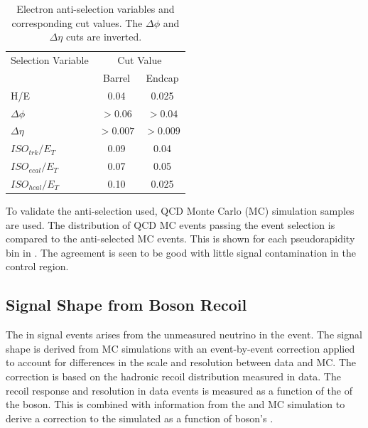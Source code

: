 \begin{table}[htbp]
  \begin{center}
    \leavevmode
    \begin{tabular}{lcc} 
    \toprule
      Selection Variable & \multicolumn{2}{c}{Cut Value}\\
                         & Barrel & Endcap\\
    \midrule
        H/E & 0.04 & 0.025 \\
        $\Delta\phi$ & $>0.06$  & $>0.04$ \\
        $\Delta\eta$ & $>0.007$ & $>0.009$\\
        $ISO_{trk} / E_T $ & 0.09 & 0.04 \\
        $ISO_{ecal}/ E_T$  & 0.07 & 0.05 \\
        $ISO_{hcal}/ E_T$  & 0.10 & 0.025\\ 
    \bottomrule
    \end{tabular}
    \caption[Electron anti-selection variables and corresponding cut values.]
{\label{tab:antisel} Electron anti-selection variables and corresponding cut
values. The $\Delta\phi$ and $\Delta\eta$ cuts are
inverted\cite{baisini2010electron}.}
  \end{center}
\end{table}

To validate the anti-selection used, {QCD} Monte Carlo (MC) simulation samples are used. The
distribution of {QCD} MC events passing the event selection is compared to the
anti-selected MC events. This is shown for each pseudorapidity bin in
. The agreement is seen to be good with little
signal contamination in the control region.

\subsection{Signal \ETm Shape from Boson Recoil}
\label{sec:recoil}
The \ETm in signal events arises from the unmeasured neutrino in the event. 
The signal \ETm shape is derived from MC simulations with an event-by-event
correction applied to account for differences in the \ETm scale and resolution
between data and MC.
The correction is based on the hadronic recoil distribution measured in data.
The recoil response and resolution in \HepProcess{\PZ\to\Plepton\Plepton} data
events is measured as a function of the \pT of the boson. This is combined with
information from the \PW and \PZ MC simulation to derive a correction to
the simulated \ETm as a function of \PW boson's \pT
\cite{bauer2010modeling,alcaraz2010updated}.

